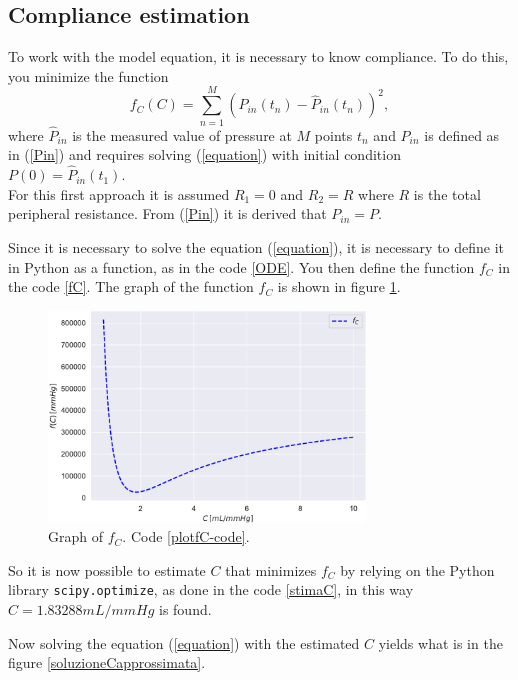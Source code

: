 \subsection{Compliance estimation}
To work with the model equation, it is necessary to know compliance. To do this, you minimize the function
\[
f_C(C)=\sum_{n=1}^M\left( P_{in}(t_n)-\hat{P}_{in}(t_n)\right)^2,
\]
where $\hat{P}_{in}$ is the measured value of pressure at $M$ points $t_n$ and $P_{in}$ is defined as in (\ref{Pin}) and requires solving (\ref{equation}) with initial condition $P(0)=\hat{P}_{in}(t_1)$.\\
For this first approach it is assumed $R_1=0$ and $R_2=R$ where $R$ is the total peripheral resistance. From (\ref{Pin}) it is derived that $P_{in}=P$.\\

\newpage

Since it is necessary to solve the equation (\ref{equation}), it is necessary to define it in Python as a function, as in the code \ref{ODE}. You then define the function $f_C$ in the code \ref{fC}. The graph of the function $f_C$ is shown in figure \ref{plotfC}.

\begin{figure}[h]
    \centering
    \includegraphics[width=0.75\textwidth]{images/Windkessel/f_C.pdf}
    \caption{Graph of $f_C$. Code \ref{plotfC-code}.}
    \label{plotfC}
\end{figure}



So it is now possible to estimate $C$ that minimizes $f_C$ by relying on the Python library \texttt{scipy.optimize}, as done in the code \ref{stimaC}, in this way $C=1.83288 mL/mmHg$ is found.



Now solving the equation (\ref{equation}) with the estimated $C$ yields what is in the figure \ref{soluzioneCapprossimata}.


